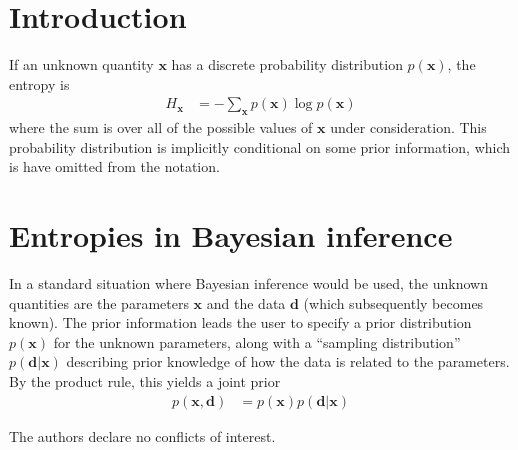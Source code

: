 \documentclass[journal,article,accept,moreauthors,pdftex,12pt,a4paper]{mdpi}
\newcommand{\x}{\boldsymbol{x}}
\renewcommand{\d}{\boldsymbol{d}}
\begin{document}

\section{Introduction}

If an unknown quantity $\x$ has a discrete probability distribution $p(\x)$,
the entropy is
\begin{align}
H_{\x} &= -\sum_{\x} p(\x) \log p(\x)
\end{align}
where the sum is over all of the possible values of $\x$ under consideration.
This probability distribution is implicitly conditional on some prior
information, which is have omitted from the notation.

\section{Entropies in Bayesian inference}

In a standard situation where Bayesian inference would be used,
the unknown quantities are the parameters $\x$ and the data $\d$
(which subsequently becomes known). The prior information leads the
user to specify a prior distribution $p(\x)$ for the unknown parameters,
along with a ``sampling distribution'' $p(\d | \x)$ describing prior knowledge
of how the data is related to the parameters. By the product rule, this yields
a joint prior
\begin{align}
p(\x, \d) &= p(\x)p(\d | \x)
\end{align}







The authors declare no conflicts of interest.


\makeatletter
\renewcommand\@biblabel[1]{#1. }
\makeatother






%

\end{document}
